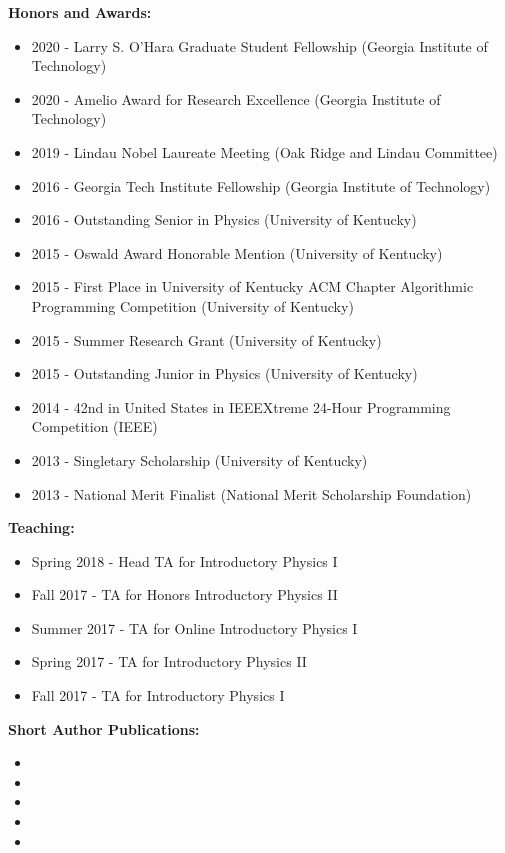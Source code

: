 \documentclass[11pt]{article}
\begin{document}
\begin{flushleft}
  \textbf{Honors and Awards:}
  \begin{itemize}
  \item 2020 - Larry S. O'Hara Graduate Student Fellowship (Georgia Institute of Technology)
  \item 2020 - Amelio Award for Research Excellence (Georgia Institute of Technology)
  \item 2019 - Lindau Nobel Laureate Meeting (Oak Ridge and Lindau Committee)
  \item 2016 - Georgia Tech Institute Fellowship (Georgia Institute of Technology)
  \item 2016 - Outstanding Senior in Physics (University of Kentucky)
  \item 2015 - Oswald Award Honorable Mention (University of Kentucky)
  \item 2015 - First Place in University of Kentucky ACM Chapter Algorithmic Programming Competition (University of Kentucky)
  \item 2015 - Summer Research Grant (University of Kentucky)
  \item 2015 - Outstanding Junior in Physics (University of Kentucky)
  \item 2014 - 42nd in United States in IEEEXtreme 24-Hour Programming Competition (IEEE)
  \item 2013 - Singletary Scholarship (University of Kentucky)
  \item 2013 - National Merit Finalist (National Merit Scholarship Foundation)
  \end{itemize}
  
  \textbf{Teaching:}
  \begin{itemize}
  \item Spring 2018 - Head TA for Introductory Physics I
  \item Fall 2017 - TA for Honors Introductory Physics II
  \item Summer 2017 - TA for Online Introductory Physics I
  \item Spring 2017 - TA for Introductory Physics II
  \item Fall 2017 - TA for Introductory Physics I
  \end{itemize}

  \textbf{Short Author Publications:}
  \begin{itemize}  
	\item {}
    \item {}
    \item {}
    \item {}
    \item {}
  \end{itemize}
  

\end{flushleft}
\end{document}
